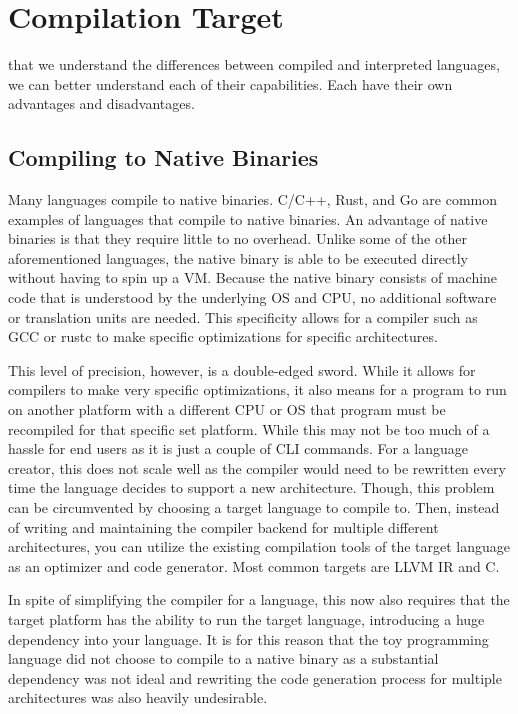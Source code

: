 \documentclass[./subfile.tex]{subfiles}
\begin{document}
    \section{Compilation Target}
         that we understand the differences between compiled and interpreted languages, we can better understand each of their capabilities. Each have their own advantages and disadvantages.
        
        \subsection{Compiling to Native Binaries}
            Many languages compile to native binaries. C/C++, Rust, and Go are common examples of languages that compile to native binaries. An advantage of native binaries is that they require little to no overhead. Unlike some of the other aforementioned languages, the native binary is able to be executed directly without having to spin up a VM. Because the native binary consists of machine code that is understood by the underlying OS and CPU, no additional software or translation units are needed. This specificity allows for a compiler such as GCC or rustc to make specific optimizations for specific architectures. 
            
            This level of precision, however, is a double-edged sword. While it allows for compilers to make very specific optimizations, it also means for a program to run on another platform with a different CPU or OS that program must be recompiled for that specific set platform. While this may not be too much of a hassle for end users as it is just a couple of CLI commands. For a language creator, this does not scale well as the compiler would need to be rewritten every time the language decides to support a new architecture. Though, this problem can be circumvented by choosing a target language to compile to. Then, instead of writing and maintaining the compiler backend for multiple different architectures, you can utilize the existing compilation tools of the target language as an optimizer and code generator. Most common targets are LLVM IR\cite{LLVM:CGO04} and C. 
            
            In spite of simplifying the compiler for a language, this now also requires that the target platform has the ability to run the target language, introducing a huge dependency into your language. It is for this reason that the toy programming language did not choose to compile to a native binary as a substantial dependency was not ideal and rewriting the code generation process for multiple architectures was also heavily undesirable.
        
\end{document}
